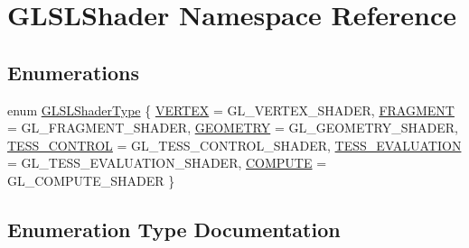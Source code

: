 \hypertarget{namespace_g_l_s_l_shader}{}\section{G\+L\+S\+L\+Shader Namespace Reference}
\label{namespace_g_l_s_l_shader}
\subsection*{Enumerations}
\begin{DoxyCompactItemize}
\item 
enum \mbox{\hyperlink{namespace_g_l_s_l_shader_a5da03bdfde28d414fcf090182b3b8177}{G\+L\+S\+L\+Shader\+Type}} \{ \newline
\mbox{\hyperlink{namespace_g_l_s_l_shader_a5da03bdfde28d414fcf090182b3b8177ab6ad7c104ea857f145384005110a1c6e}{V\+E\+R\+T\+EX}} = G\+L\+\_\+\+V\+E\+R\+T\+E\+X\+\_\+\+S\+H\+A\+D\+ER, 
\mbox{\hyperlink{namespace_g_l_s_l_shader_a5da03bdfde28d414fcf090182b3b8177a85031a5a60d6ee9c4adbb3b28b85946e}{F\+R\+A\+G\+M\+E\+NT}} = G\+L\+\_\+\+F\+R\+A\+G\+M\+E\+N\+T\+\_\+\+S\+H\+A\+D\+ER, 
\mbox{\hyperlink{namespace_g_l_s_l_shader_a5da03bdfde28d414fcf090182b3b8177a6aaa8667eec47f0f967e7082c23fcdcc}{G\+E\+O\+M\+E\+T\+RY}} = G\+L\+\_\+\+G\+E\+O\+M\+E\+T\+R\+Y\+\_\+\+S\+H\+A\+D\+ER, 
\mbox{\hyperlink{namespace_g_l_s_l_shader_a5da03bdfde28d414fcf090182b3b8177a82c6bbf24e589498e119365b252e4dcc}{T\+E\+S\+S\+\_\+\+C\+O\+N\+T\+R\+OL}} = G\+L\+\_\+\+T\+E\+S\+S\+\_\+\+C\+O\+N\+T\+R\+O\+L\+\_\+\+S\+H\+A\+D\+ER, 
\newline
\mbox{\hyperlink{namespace_g_l_s_l_shader_a5da03bdfde28d414fcf090182b3b8177a2789dee13d030cfc5c6559b6de9e1767}{T\+E\+S\+S\+\_\+\+E\+V\+A\+L\+U\+A\+T\+I\+ON}} = G\+L\+\_\+\+T\+E\+S\+S\+\_\+\+E\+V\+A\+L\+U\+A\+T\+I\+O\+N\+\_\+\+S\+H\+A\+D\+ER, 
\mbox{\hyperlink{namespace_g_l_s_l_shader_a5da03bdfde28d414fcf090182b3b8177a2002a20b92a61a5075032be745d6f421}{C\+O\+M\+P\+U\+TE}} = G\+L\+\_\+\+C\+O\+M\+P\+U\+T\+E\+\_\+\+S\+H\+A\+D\+ER
 \}
\end{DoxyCompactItemize}


\subsection{Enumeration Type Documentation}
\mbox{\label{namespace_g_l_s_l_shader_a5da03bdfde28d414fcf090182b3b8177}} 
